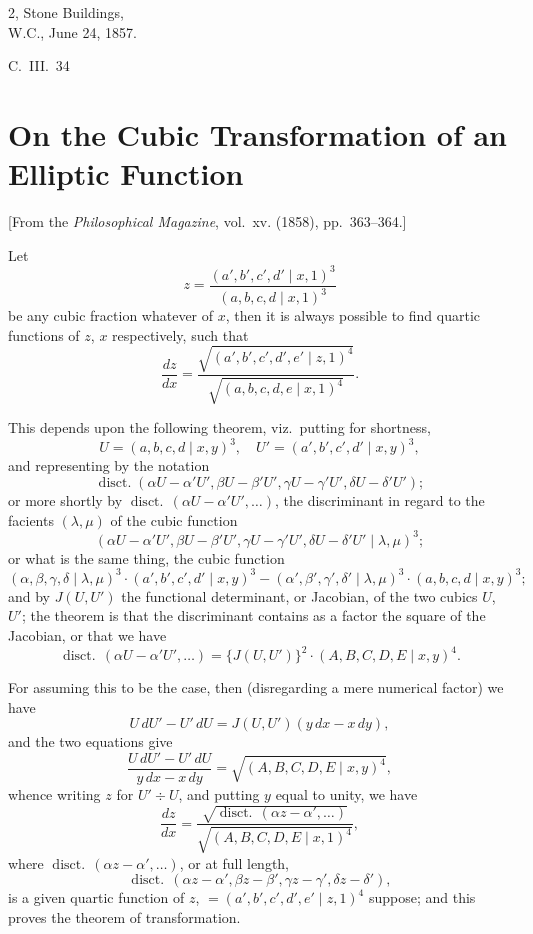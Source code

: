 \documentclass[11pt,a4paper]{article}
\theoremstyle{plain}
\begin{document}
\begin{flushright}
2, Stone Buildings,\\
W.C., June 24, 1857.
\end{flushright}
\hfill C.~III.~34
\newpage


\section{On the Cubic Transformation of an Elliptic Function}
\label{sec:210}

[From the \textit{Philosophical Magazine}, vol.~xv. (1858), pp.~363--364.]
\vspace{1em}

Let
\[
z = \frac{(a', b', c', d' \mid x, 1)^3}{(a, b, c, d \mid x, 1)^3}
\]
be any cubic fraction whatever of $x$, then it is always possible to find quartic functions of $z$, $x$ respectively, such that
\[
\frac{dz}{dx} = \frac{\sqrt{(a', b', c', d', e' \mid z, 1)^4}}{\sqrt{(a, b, c, d, e \mid x, 1)^4}}.
\]

This depends upon the following theorem, viz.\ putting for shortness,
\[
U = (a, b, c, d \mid x, y)^3, \quad U' = (a', b', c', d' \mid x, y)^3,
\]
and representing by the notation
\[
\operatorname{disct.} (\alpha U - \alpha' U', \beta U - \beta' U', \gamma U - \gamma' U', \delta U - \delta' U');
\]
or more shortly by $\operatorname{disct.}\,(\alpha U - \alpha' U', \ldots)$, the discriminant in regard to the facients $(\lambda, \mu)$ of the cubic function
\[
(\alpha U - \alpha' U', \beta U - \beta' U', \gamma U - \gamma' U', \delta U - \delta' U' \mid \lambda, \mu)^3;
\]
or what is the same thing, the cubic function
\[
(\alpha, \beta, \gamma, \delta \mid \lambda, \mu)^3 \cdot (a', b', c', d' \mid x, y)^3 - (\alpha', \beta', \gamma', \delta' \mid \lambda, \mu)^3 \cdot (a, b, c, d \mid x, y)^3;
\]
and by $J(U, U')$ the functional determinant, or Jacobian, of the two cubics $U$, $U'$; the theorem is that the discriminant contains as a factor the square of the Jacobian, or that we have
\[
\operatorname{disct.}\,(\alpha U - \alpha' U', \ldots) = \{J(U, U')\}^2 \cdot (A, B, C, D, E \mid x, y)^4.
\]

For assuming this to be the case, then (disregarding a mere numerical factor) we have
\[
U\,dU' - U'\,dU = J(U, U')(y\,dx - x\,dy),
\]
and the two equations give
\[
\frac{U\,dU' - U'\,dU}{y\,dx - x\,dy} = \sqrt{(A, B, C, D, E \mid x, y)^4},
\]
whence writing $z$ for $U' \div U$, and putting $y$ equal to unity, we have
\[
\frac{dz}{dx} = \frac{\sqrt{\operatorname{disct.}\,(\alpha z - \alpha', \ldots)}}{\sqrt{(A, B, C, D, E \mid x, 1)^4}},
\]
where $\operatorname{disct.}\,(\alpha z - \alpha', \ldots)$, or at full length,
\[
\operatorname{disct.}\,(\alpha z - \alpha', \beta z - \beta', \gamma z - \gamma', \delta z - \delta'),
\]
is a given quartic function of $z$, $= (a', b', c', d', e' \mid z, 1)^4$ suppose; and this proves the theorem of transformation.
\end{document}
